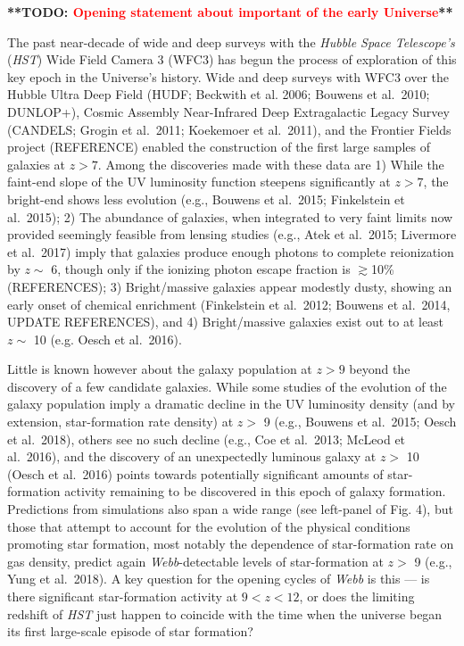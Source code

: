 \documentclass[12pt]{article}
\newcommand{\todo}[1]{\textbf{**TODO: \textcolor{red}{#1}**}}
\begin{document}
\clearpage

\justification          %


\todo{Opening statement about important of the early Universe}

The past near-decade of wide and deep surveys with the {\it Hubble Space Telescope’s} ({\it HST}) Wide Field Camera 3 (WFC3) has begun the process of exploration of this key epoch in the Universe’s history.  Wide and deep surveys with WFC3 over the Hubble Ultra Deep Field (HUDF; Beckwith et al. 2006; Bouwens et al.\ 2010; DUNLOP+), Cosmic Assembly Near-Infrared Deep Extragalactic Legacy Survey (CANDELS; Grogin et al.\ 2011; Koekemoer et al.\ 2011), and the Frontier Fields project (REFERENCE) enabled the construction of the first large samples of galaxies at $z>7$.  Among the discoveries made with these data are 1) While the faint-end slope of the UV luminosity function steepens significantly at $z>7$, the bright-end shows less evolution (e.g., Bouwens et al.\ 2015; Finkelstein et al.\ 2015); 2) The abundance of galaxies, when integrated to very faint limits now provided seemingly feasible from lensing studies (e.g., Atek et al.\ 2015; Livermore et al.\ 2017) imply that galaxies produce enough photons to complete reionization by $z\sim$ 6, though only if the ionizing photon escape fraction is $\gtrsim$10\% (REFERENCES); 3) Bright/massive galaxies appear modestly dusty, showing an early onset of chemical enrichment (Finkelstein et al.\ 2012; Bouwens et al.\ 2014, UPDATE REFERENCES), and 4) Bright/massive galaxies exist out to at least $z \sim$ 10 (e.g. Oesch et al.\ 2016).

Little is known however about the galaxy population at $z>9$ beyond the discovery of a few candidate galaxies.  While some studies of the evolution of the galaxy population imply a dramatic decline in the UV luminosity density (and by extension, star-formation rate density) at $z >$ 9 (e.g., Bouwens et al.\ 2015; Oesch et al.\ 2018), others see no such decline (e.g., Coe et al.\ 2013; McLeod et al.\ 2016), and the discovery of an unexpectedly luminous galaxy at $z >$ 10 (Oesch et al.\ 2016) points towards potentially significant amounts of star-formation activity remaining to be discovered in this epoch of galaxy formation.  Predictions from simulations also span a wide range (see left-panel of Fig. 4), but those that attempt to account for the evolution of the physical conditions promoting star formation, most notably the dependence of star-formation rate on gas density, predict again {\it Webb}-detectable levels of star-formation at $z >$ 9 (e.g., Yung et al.\ 2018).  A key question for the opening cycles of {\it Webb} is this — is there significant star-formation activity at  $9<z<12$, or does the limiting redshift of {\it HST} just happen to coincide with the time when the universe began its first large-scale episode of star formation?
\end{document}
